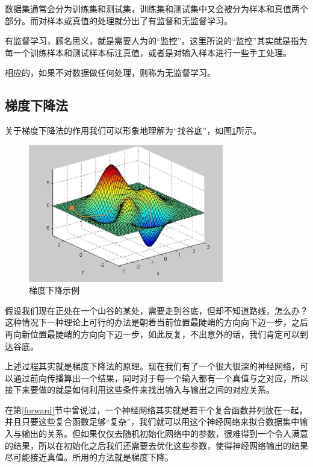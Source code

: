 \documentclass[UTF8,a4paper]{ctexart}
\begin{document}
\begin{multicols}{2}
			\indent 数据集通常会分为训练集和测试集，训练集和测试集中又会被分为样本和真值两个部分。而对样本或真值的处理就分出了有监督和无监督学习。
						
			\indent 有监督学习，顾名思义，就是需要人为的“监控”。这里所说的“监控”其实就是指为每一个训练样本和测试样本标注真值，或者是对输入样本进行一些手工处理。
			
			\indent 相应的，如果不对数据做任何处理，则称为无监督学习。
			
		\subsection{梯度下降法}\label{梯度下降法}
			\indent 关于梯度下降法的作用我们可以形象地理解为“找谷底”，如图\ref{gradient_descent}所示。
			
			\begin{figure}[H]
			\includegraphics[width=1\linewidth,height=6cm]{gradient_descent.jpeg}
			\caption{梯度下降示例}
			\label{gradient_descent}
		\end{figure}
			
			\indent 假设我们现在正处在一个山谷的某处，需要走到谷底，但却不知道路线，怎么办？这种情况下一种理论上可行的办法是朝着当前位置最陡峭的方向向下迈一步，之后再向新位置最陡峭的方向向下迈一步，如此反复，不出意外的话，我们肯定可以到达谷底。
			
			\indent 上述过程其实就是梯度下降法的原理。现在我们有了一个很大很深的神经网络，可以通过前向传播算出一个结果，同时对于每一个输入都有一个真值与之对应，所以接下来要做的就是如何利用这些条件来找出输入与输出之间的对应关系。
			
			\indent 在第\ref{forward}节中曾说过，一个神经网络其实就是若干个复合函数并列放在一起，并且只要这些复合函数足够“复杂”，我们就可以用这个神经网络来拟合数据集中输入与输出的关系。但如果仅仅去随机初始化网络中的参数，很难得到一个令人满意的结果，所以在初始化之后我们还需要去优化这些参数，使得神经网络输出的结果尽可能接近真值。所用的方法就是梯度下降。
			

\end{multicols}
\end{document}
